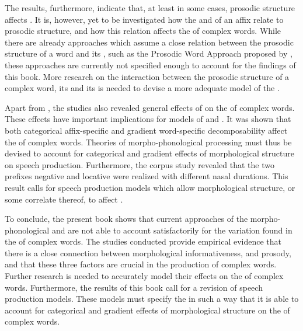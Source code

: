 The results, furthermore, indicate that, at least in some cases, prosodic structure affects . It is, however, yet to be investigated how the  and  of an affix relate to prosodic structure, and how this relation affects the  of complex words. 
While there are already approaches which assume a close relation between the prosodic structure of a word and its , such as the Prosodic Word Approach proposed by \cite{Raffelsiefen.1999}, these approaches are currently not specified enough to account for the findings of this book.  More research on the interaction between the prosodic structure of a complex word, its  and its   is needed to devise a more adequate model of the .

Apart from , the studies also revealed general effects of  on the  of complex words. These effects have important implications for models of  and . It was shown that both categorical affix-specific  and gradient {word-specific decomposability} affect the  of complex words. Theories of morpho-phonological processing must thus be devised to account for categorical and gradient effects of morphological structure on speech production.
Furthermore, the corpus study revealed that the two  prefixes negative  and locative  were realized with different nasal durations. This result calls for speech production models which allow morphological structure, or some correlate thereof, to affect . 

To conclude, the present book shows that current approaches of the morpho-phonological and  are not able to account satisfactorily for the variation found in the  of complex words. 
 The studies conducted provide empirical evidence that there is a close connection between morphological informativeness,  and prosody, and that these three factors are crucial in the production of complex words. 
Further research is needed to accurately model their effects on the  of complex words.
Furthermore, the results of this book call for a revision of speech production models. These models must specify the  in such a way that it is able to account for categorical and gradient effects of morphological structure on the  of complex words.
